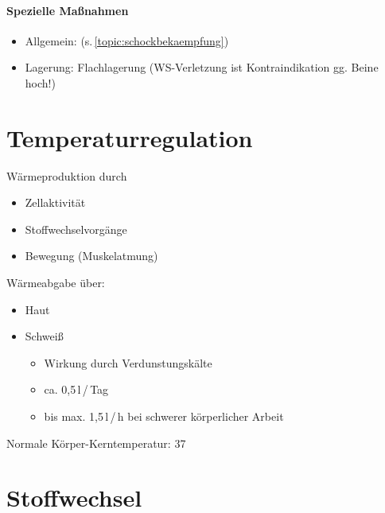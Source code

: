 \begin{gMassnahmenEnv}
    \paragraph{Spezielle Ma{\ss}nahmen}
    
    \begin{itemize}
        \item Allgemein:  (s.\,\ref{topic:schockbekaempfung})
        \item Lagerung: Flachlagerung (WS-Verletzung ist Kontraindikation gg.
        Beine hoch!)
    \end{itemize}
\end{gMassnahmenEnv}
\section{Temperaturregulation}

W\"armeproduktion durch

\begin{itemize}
    \item Zellaktivit\"at
    \item Stoffwechselvorg\"ange
    \item Bewegung (Muskelatmung)
\end{itemize}
W\"armeabgabe \"uber:
\begin{itemize}
    \item Haut
    \item Schwei{\ss}
    
    \begin{itemize}
        \item Wirkung durch Verdunstungsk\"alte
        \item ca. 0,5\,l\,/\,Tag
        \item bis max. 1,5\,l\,/\,h bei schwerer
        k\"orperlicher  Arbeit
    \end{itemize}
\end{itemize}

Normale Körper-Kerntemperatur: 37\textcelsius


\section{Stoffwechsel}


